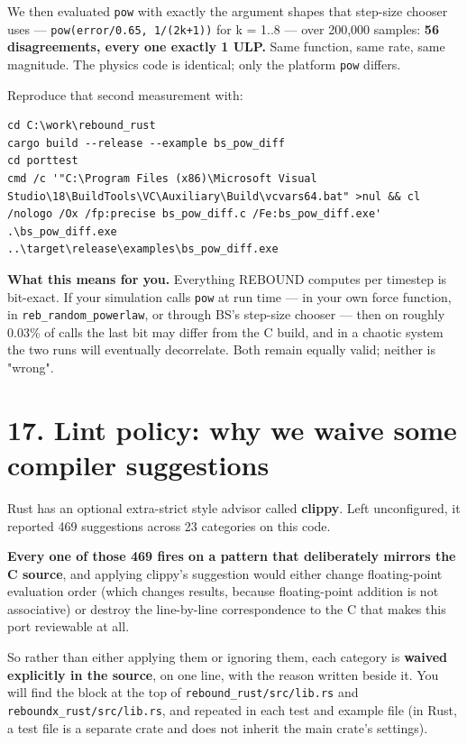 \documentclass[11pt]{article}
\begin{document}
We then evaluated \texttt{pow} with exactly the argument shapes that step-size chooser uses --- \texttt{pow(error/0.65, 1/(2k+1))} for k = 1..8 --- over 200,000 samples: \textbf{56 disagreements, every one exactly 1 ULP.} Same function, same rate, same magnitude. The physics code is identical; only the platform \texttt{pow} differs.

Reproduce that second measurement with:

\begin{lstlisting}
cd C:\work\rebound_rust
cargo build --release --example bs_pow_diff
cd porttest
cmd /c '"C:\Program Files (x86)\Microsoft Visual Studio\18\BuildTools\VC\Auxiliary\Build\vcvars64.bat" >nul && cl /nologo /Ox /fp:precise bs_pow_diff.c /Fe:bs_pow_diff.exe'
.\bs_pow_diff.exe
..\target\release\examples\bs_pow_diff.exe
\end{lstlisting}

\textbf{What this means for you.} Everything REBOUND computes per timestep is bit-exact. If your simulation calls \texttt{pow} at run time --- in your own force function, in \texttt{reb\_random\_powerlaw}, or through BS's step-size chooser --- then on roughly 0.03\% of calls the last bit may differ from the C build, and in a chaotic system the two runs will eventually decorrelate. Both remain equally valid; neither is "wrong".

\section{17. Lint policy: why we waive some compiler suggestions}

Rust has an optional extra-strict style advisor called \textbf{clippy}. Left unconfigured, it reported 469 suggestions across 23 categories on this code.

\textbf{Every one of those 469 fires on a pattern that deliberately mirrors the C source}, and applying clippy's suggestion would either change floating-point evaluation order (which changes results, because floating-point addition is not associative) or destroy the line-by-line correspondence to the C that makes this port reviewable at all.

So rather than either applying them or ignoring them, each category is \textbf{waived explicitly in the source}, on one line, with the reason written beside it. You will find the block at the top of \texttt{rebound\_rust/src/lib.rs} and \texttt{reboundx\_rust/src/lib.rs}, and repeated in each test and example file (in Rust, a test file is a separate crate and does not inherit the main crate's settings).
\end{document}
